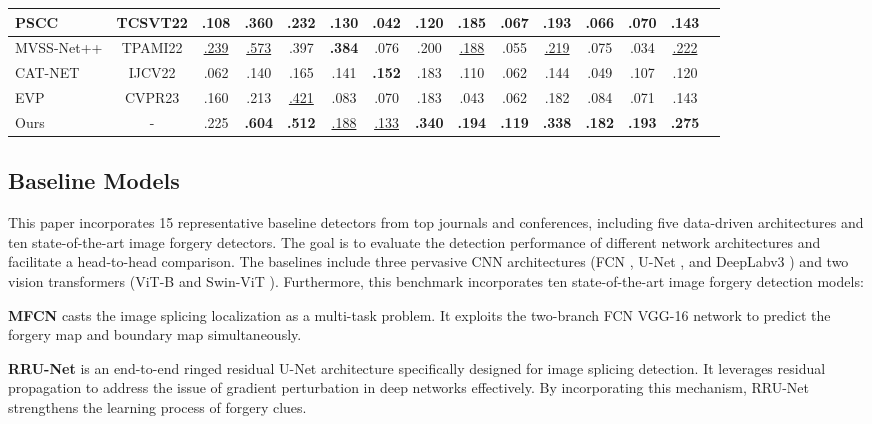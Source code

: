 \documentclass[10pt,journal,compsoc]{IEEEtran}
\begin{document}
\begin{table*}
{\begin{tabular}{lcccccccccccccc}
    PSCC \cite{liu2022pscc} & TCSVT22 & .108 & .360 & .232 & .130 & .042 & .120 & {.185} & .067 & .193 & .066 & .070 & .143\\  								
    \midrule										
    MVSS-Net++ \cite{dong2022mvss} & TPAMI22 & \underline{.239} & \underline{.573} & {.397} & \textbf{.384} & .076 & .200 & \underline{.188} & .055 & \underline{.219} & .075 & .034 & \underline{.222}\\  
    \midrule	
    CAT-NET \cite{kwon2022learning} & IJCV22 & .062 & .140 & .165 & .141 & \textbf{.152} & .183 & .110 & .062 & .144 & .049 & .107 & .120\\		
    \midrule 											
    EVP \cite{liu2023evp} & CVPR23 & .160 & .213 & \underline{.421} & .083 & .070 & .183 & .043 & .062 & .182 & .084 & .071 & .143 \\				
    \midrule[1.5pt]
    Ours & - & .225 & \textbf{.604} & \textbf{.512} & \underline{.188} & \underline{.133} & \textbf{.340} & \textbf{.194} & \textbf{.119} & \textbf{.338} & \textbf{.182} & \textbf{.193} & \textbf{.275} \\
    \bottomrule	
  \end{tabular}}
  \label{iou_table}
\end{table*}

\subsection{Baseline Models} 
This paper incorporates 15 representative baseline detectors from top journals and conferences, including five data-driven architectures and ten state-of-the-art image forgery detectors. The goal is to evaluate the detection performance of different network architectures and facilitate a head-to-head comparison. The baselines include three pervasive CNN architectures (FCN \cite{long2015fully}, U-Net \cite{ronneberger2015u}, and DeepLabv3 \cite{chen2017deeplab}) and two vision transformers (ViT-B \cite{dosovitskiy2020vit} and Swin-ViT \cite{liu2021swin}). Furthermore, this benchmark incorporates ten state-of-the-art image forgery detection models: 

\noindent\textbf{MFCN} \cite{salloum2018image} casts the image splicing localization as a multi-task problem. It exploits the two-branch FCN VGG-16 network to predict the forgery map and boundary map simultaneously.

\noindent\textbf{RRU-Net} \cite{bi2019rru} is an end-to-end ringed residual U-Net architecture specifically designed for image splicing detection. It leverages residual propagation to address the issue of gradient perturbation in deep networks effectively. By incorporating this mechanism, RRU-Net strengthens the learning process of forgery clues.
\end{document}
